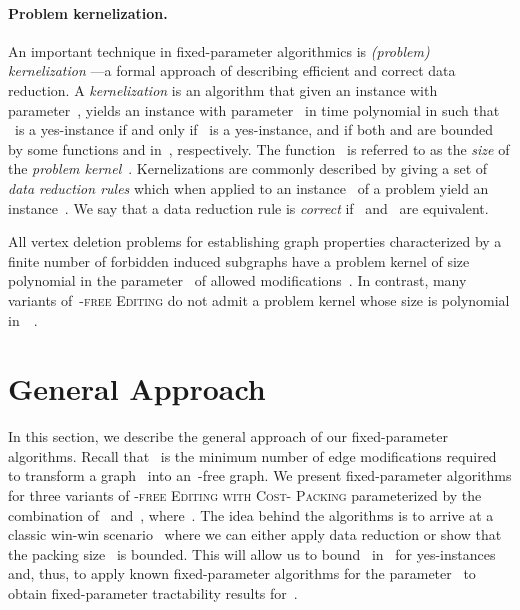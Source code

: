 \documentclass[envcountsame,numbook,smallextended]{svjour3}
\numberwithin{equation}{section}
\numberwithin{figure}{section}
\newcommand{\ffed}{\textsc{-free Editing}}
\newcommand{\tffedv}{\textsc{-free Editing with Cost- Packing}}
\begin{document}
\paragraph{Problem kernelization.} An important technique in
fixed-parameter algorithmics is \emph{(problem) kernelization}
\citep{Kra14}---a formal approach of describing efficient and
correct data reduction.  A \emph{kernelization} is an algorithm
that given an instance  with parameter~, yields an instance 
with parameter~ in time polynomial in  such that ~is
a yes-instance if and only if ~is a yes-instance, and if both
 and  are bounded by some functions  and  in~,
respectively. The function~ is referred to as the \emph{size} of
the \emph{problem kernel}~. Kernelizations are commonly
described by giving a set of \emph{data reduction rules} which when
applied to an instance~ of a problem yield an instance~. We say
that a data reduction rule is \emph{correct} if~ and~ are equivalent.


All vertex deletion problems for establishing graph properties
characterized by a finite number of forbidden induced subgraphs have a
problem kernel of size polynomial in the parameter~ of allowed
modifications~\citep{Kra12}.  In contrast, many variants of~\ffed{} do
not admit a problem kernel whose size is polynomial
in~~\cite{KW13,GHPP13,CC15}. 

\section{General Approach}\label{sec:approach}

In this section, we describe the general approach of our
fixed-parameter algorithms. Recall that ~is the minimum
number of edge modifications required to transform a graph~ into
an~-free graph.  We present fixed-parameter algorithms for three
variants of \tffedv{} parameterized by the combination of~
and~,
where~. The idea behind the
algorithms is to arrive at a classic
win-win scenario~\cite{Fell03} where we can either apply data
reduction or show that the packing size~ is bounded.  This
will allow us to bound~ in~ for yes-instances and,
thus, to apply known fixed-parameter algorithms for the
parameter~ to obtain fixed-parameter tractability results
for~.
\end{document}

